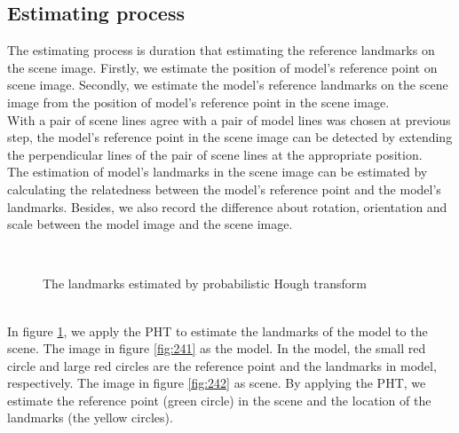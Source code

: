 \subsection{Estimating process}
The estimating process is duration that estimating the reference landmarks on the scene image. Firstly, we estimate the position of model's reference point on scene image. Secondly, we estimate the model's reference landmarks on the scene image from the position of model's reference point in the scene image.\\
With a pair of scene lines agree with a pair of model lines was chosen at previous step, the model's reference point in the scene image can be detected by extending the perpendicular lines of the pair of scene lines at the appropriate position\cite{ashbrook1995robust}.\\[0.2cm]
The estimation of model's landmarks in the scene image can be estimated by calculating the relatedness between the model's reference point and the model's landmarks. Besides, we also record the difference about rotation, orientation and scale between the model image and the scene image.
\begin{figure}[h!]
\centering
{}~~
\caption{The landmarks estimated by probabilistic Hough transform}
\label{fig:24}
\end{figure}~\\
In figure \ref{fig:24}, we apply the PHT to estimate the landmarks of the model to the scene. The image in figure \ref{fig:241} as the model. In the model, the small red circle and large red circles are the reference point and the landmarks in model, respectively. The image in figure \ref{fig:242} as scene. By applying the PHT, we estimate the reference point (green circle) in the scene and the location of the landmarks (the yellow circles).
